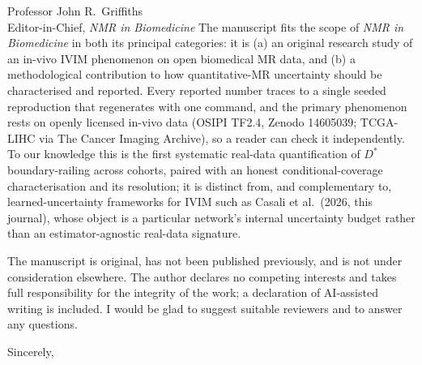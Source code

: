 \documentclass[11pt]{letter}
\begin{document}
\begin{letter}{Professor John R.\ Griffiths \\ Editor-in-Chief, \textit{NMR in Biomedicine}}
The manuscript fits the scope of \textit{NMR in Biomedicine} in both its principal
categories: it is (a) an original research study of an in-vivo IVIM phenomenon on open
biomedical MR data, and (b) a methodological contribution to how quantitative-MR
uncertainty should be characterised and reported. Every reported number traces to a
single seeded reproduction that regenerates with one command, and the primary phenomenon
rests on openly licensed in-vivo data (OSIPI TF2.4, Zenodo 14605039; TCGA-LIHC via The
Cancer Imaging Archive), so a reader can check it independently. To our knowledge this is
the first systematic real-data quantification of $D^{*}$ boundary-railing across cohorts,
paired with an honest conditional-coverage characterisation and its resolution; it is
distinct from, and complementary to, learned-uncertainty frameworks for IVIM such as
Casali et al.\ (2026, this journal), whose object is a particular network's internal
uncertainty budget rather than an estimator-agnostic real-data signature.

The manuscript is original, has not been published previously, and is not under
consideration elsewhere. The author declares no competing interests and takes full
responsibility for the integrity of the work; a declaration of AI-assisted writing is
included. I would be glad to suggest suitable reviewers and to answer any questions.

\closing{Sincerely,}

\end{letter}
\end{document}
